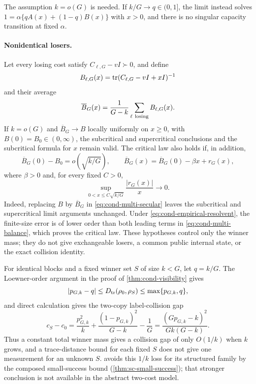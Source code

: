The assumption $k=o(G)$ is needed.  If $k/G\to q\in(0,1]$, the limit
instead solves $1=\alpha\{qA(x)+(1-q)B(x)\}$ with $x>0$, and there is no
singular capacity transition at fixed $\alpha$.

\paragraph{Nonidentical losers.}
Let every losing cost satisfy $C_{\ell,G}-vI\succ0$, and define
\[
 B_{\ell,G}(x)=\operatorname{tr}(C_{\ell,G}-vI+xI)^{-1}
\]
and their average
\[
 \overline B_G(x)=\frac1{G-k}
       \sum_{\ell\ {\rm losing}}B_{\ell,G}(x).
\]
If $k=o(G)$ and $\overline B_G\to B$ locally uniformly on $x\ge0$, with
$B(0)=B_0\in(0,\infty)$, the subcritical and supercritical conclusions and
the subcritical formula for $x$ remain valid.  The critical law also holds
if, in addition,
\begin{equation}
 \overline B_G(0)-B_0=o(\sqrt{k/G}),\qquad
 \overline B_G(x)=\overline B_G(0)-\beta x+r_G(x),         \label{eq:cond-empirical-resolvent}
\end{equation}
where $\beta>0$ and, for every fixed $C>0$,
\[
 \sup_{0<x\le C\sqrt{k/G}}\frac{|r_G(x)|}{x}\longrightarrow0.
\]
Indeed, replacing $B$ by $\overline B_G$ in
\eqref{eq:cond-multi-secular} leaves the subcritical and supercritical limit
arguments unchanged.  Under \eqref{eq:cond-empirical-resolvent}, the
finite-size error is of lower order than both leading terms in
\eqref{eq:cond-multi-balance}, which proves the critical law.  These
hypotheses control only the winner mass; they do not give exchangeable
losers, a common public internal state, or the exact collision identity.

For identical blocks and a fixed winner set $S$ of size $k<G$, let
$q=k/G$.  The Loewner-order argument in the proof of
\cref{thm:cond-visibility} gives
\begin{equation}
 |p_{G,k}-q|\le D_{\mathrm{tr}}(\rho_0,\rho_S)\le\max\{p_{G,k},q\},     \label{eq:cond-multi-visibility}
\end{equation}
and direct calculation gives the two-copy label-collision gap
\begin{equation}
 c_S-c_0=\frac{p_{G,k}^2}{k}+\frac{(1-p_{G,k})^2}{G-k}-\frac1G
 =\boxed{\frac{(Gp_{G,k}-k)^2}{Gk(G-k)}}.                 \label{eq:cond-multi-collision}
\end{equation}
Thus a constant total winner mass gives a collision gap of only $O(1/k)$
when $k$ grows, and a trace-distance bound for each fixed $S$ does not give
one measurement for an unknown $S$.  
avoids this $1/k$ loss for its structured family by the composed
small-success bound (\cref{thm:sc-small-success}); that stronger conclusion
is not available in the abstract two-cost model.

